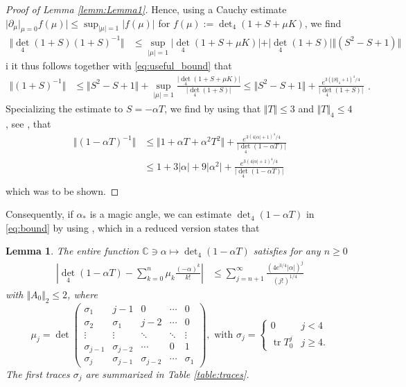 \documentclass[reqno,12pt,letterpaper]{amsart}
\newcommand{\CC}{{\mathbb C}}
\newtheorem{lemm}[theo]{Lemma}
\numberwithin{equation}{section}
\DeclareMathOperator{\tr}{tr}
\begin{document}
\begin{proof}[Proof of Lemma \ref{lemm:Lemma1}]
Hence, using a Cauchy estimate $\vert \partial_{\mu} \vert_{\mu=0} f(\mu) \vert \le \sup_{\vert \mu \vert=1} \vert f(\mu) \vert$ for $f(\mu):= \det_4(1+S+\mu K)$, we find
\[\begin{split} \Vert \det_4(1+S) (1+S)^{-1} \Vert &\le \sup_{\vert \mu \vert=1}  \vert \det_4(1+S+\mu K) \vert+  \vert \det_4(1+S)\vert \Vert (S^2-S+1)\Vert \end{split}\]i
it thus follows together with \eqref{eq:useful_bound} that
\[\begin{split} \Vert  (1+S)^{-1} \Vert &\le \Vert S^2-S+1  \Vert + \sup_{\vert \mu \vert=1}  \frac{\vert \det_4(1+S+\mu K) \vert}{\vert \det_4(1+S)\vert}\le  \Vert S^2-S+1 \Vert + \frac{e^{3 (\Vert S \Vert_4 + 1)^4/4 }}{\vert \det_4(1+S)\vert} \end{split}.\]
Specializing the estimate to $S = - \alpha T$, we find by using that $\Vert T\Vert \le 3 $ and  $\Vert T \Vert_4\le 4$, see \cite[Lemma $4.1$]{bhz2}, that
\[ \begin{split} \Vert  (1-\alpha T)^{-1} \Vert 
&\le \Vert 1 + \alpha T+ \alpha^2 T^2 \Vert  + \frac{e^{3 (4\vert \alpha \vert  + 1)^4/4}}{\vert \det_4(1-\alpha T)\vert} \\ 
&\le 1 + 3 \vert \alpha\vert   +9\vert  \alpha^2 \vert  + \frac{e^{3 (4\vert \alpha \vert  + 1)^4/4}}{\vert \det_4(1-\alpha T)\vert} \\ 
\end{split}\]
which was to be shown.
\end{proof}
Consequently, if $\alpha_*$ is a magic angle, we can estimate $\det_4(1- \alpha T)$ in \eqref{eq:bound} by using \cite[Lemma $5.1$]{bhz3}, which in a reduced version states that
\begin{lemm}
\label{lemm:aux_lemm}
The entire function $\CC \ni \alpha \mapsto \operatorname{det}_4(1-\alpha T)$ satisfies for any $n \ge 0$
\[ \begin{split}
\left\lvert  \operatorname{det}_4(1-\alpha T) -\sum_{k=0}^{n} \mu_k \frac{(-\alpha)^k}{k!} \right\rvert &\le \sum_{j=n+1}^{\infty}   \frac{(4e^{3/4}  \vert \alpha\vert)^j}{(j!)^{1/4}} \end{split} \] 
with $\Vert A_{0} \Vert_2 \le 2$, where 
\begin{equation}
\label{eq:muk}
 {\mu}_j =  \operatorname{det}\begin{pmatrix} \sigma_1 & j-1 &0 & \cdots & 0 \\
\sigma_2 & \sigma_1 & j-2 & \cdots & 0 \\
\vdots & \vdots & \ddots & \ddots & \vdots \\ 
\sigma_{j-1}& \sigma_{j-2} & \cdots  & 0  & 1\\
\sigma_{j} & \sigma_{j-1}  & \sigma_{j-2}& \cdots & \sigma_1 \end{pmatrix}, \text{ with }  \sigma_j= \begin{cases} 
 0 & j < 4 \\
\tr T_{0}^{j} & j \ge 4. 
\end{cases}
\end{equation}
The first traces $\sigma_j$ are summarized in Table \ref{table:traces}.
\end{lemm}
\end{document}
